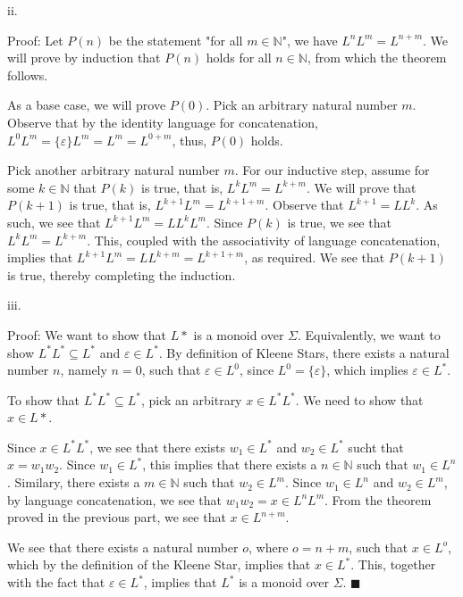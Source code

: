\documentclass{article}
\renewcommand{\(}{\left(}
\renewcommand{\)}{\right)}
\renewcommand\qedsymbol{$\blacksquare$}
\theoremstyle{plain}
\theoremstyle{plain}
\theoremstyle{definition}
\begin{document}
    ii.
    \begin{shaded}
        Proof: Let $P(n)$ be the statement "for all $m\in\mathbb{N}$", we have $L^{n}L^{m}=L^{n+m}$. We will prove by induction that $P(n)$ holds for all $n\in\mathbb{N}$, from which the theorem follows.

        \vspace*{4mm}

        As a base case, we will prove $P(0)$. Pick an arbitrary natural number $m$. Observe that by the identity language for concatenation, $L^{0}L^{m}=\{\varepsilon\}L^{m}=L^{m}=L^{0+m}$, thus, $P(0)$ holds.

        \vspace*{4mm}

        Pick another arbitrary natural number $m$. For our inductive step, assume for some $k\in\mathbb{N}$ that $P(k)$ is true, that is, $L^{k}L^{m}=L^{k+m}$. We will prove that $P(k+1)$ is true, that is, $L^{k+1}L^{m}=L^{k+1+m}$. Observe that $L^{k+1}=LL^{k}$. As such, we see that $L^{k+1}L^{m}=LL^{k}L^{m}$. Since $P(k)$ is true, we see that $L^{k}L^{m}=L^{k+m}$. This, coupled with the associativity of language concatenation, implies that $L^{k+1}L^{m}=LL^{k+m}=L^{k+1+m}$, as required. We see that $P(k+1)$ is true, thereby completing the induction.
    \end{shaded}
    
    
    iii.
    \begin{shaded}
        Proof: We want to show that $L*$ is a monoid over $\Sigma$. Equivalently, we want to show $L^{*}L^{*}\subseteq L^{*}$ and $\varepsilon\in L^{*}$. By definition of Kleene Stars, there exists a natural number $n$, namely $n=0$, such that $\varepsilon\in L^{0}$, since $L^{0}=\{\varepsilon\}$, which implies $\varepsilon\in L^{*}$.
        
        \vspace*{4mm}
        
        To show that $L^{*}L^{*}\subseteq L^{*}$, pick an arbitrary $x\in L^{*}L^{*}$. We need to show that $x\in L*$.

        \vspace*{4mm}

        Since $x\in L^{*}L^{*}$, we see that there exists $w_{1}\in L^{*}$ and $w_{2}\in L^{*}$ sucht that $x=w_{1}w_{2}$. Since $w_{1}\in L^{*}$, this implies that there exists a $n\in\mathbb{N}$ such that $w_{1}\in L^{n}$. Similary, there exists a $m\in\mathbb{N}$ such that $w_{2}\in L^{m}$. Since $w_{1}\in L^{n}$ and $w_{2}\in L^{m}$, by language concatenation, we see that $w_{1}w_{2}=x\in L^{n}L^{m}$. From the theorem proved in the previous part, we see that $x\in L^{n+m}$. 

        \vspace*{4mm}

        We see that there exists a natural number $o$, where $o=n+m$, such that $x\in L^{o}$, which by the definition of the Kleene Star, implies that $x\in L^{*}$. This, together with the fact that $\varepsilon\in L^{*}$, implies that $L^{*}$ is a monoid over $\Sigma$. \qedsymbol
    \end{shaded}
    
\end{document}
